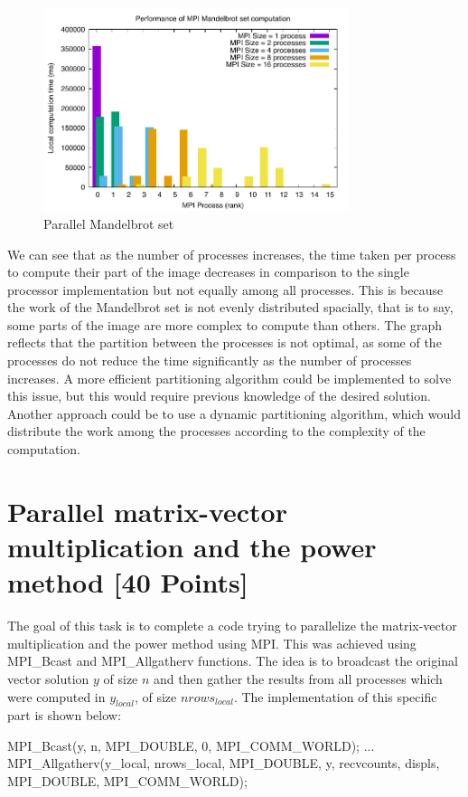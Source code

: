\documentclass[unicode,11pt,a4paper,oneside,numbers=endperiod,openany]{scrartcl}
\begin{document}
\begin{figure}[h!]
    \centering
    \includegraphics[width=0.8\textwidth]{../mandel/perf.pdf}
    \caption{Parallel Mandelbrot set}
    \label{fig:mandelbrot_parallel}
\end{figure}
We can see that as the number of processes increases, the time taken per process
to compute their part of the image decreases in comparison to the single
processor implementation but not equally among all processes. This is because
the work of the Mandelbrot set is not evenly distributed spacially, that is to
say, some parts of the image are more complex to compute than others. The graph
reflects that the partition between the processes is not optimal, as some of the
processes do not reduce the time significantly as the number of processes
increases. A more efficient partitioning algorithm could be implemented to solve
this issue, but this would require previous knowledge of the desired solution.
Another approach could be to use a dynamic partitioning algorithm, which would
distribute the work among the processes according to the complexity of the
computation.


\section{Parallel matrix-vector multiplication and the power method
[40 Points]}

The goal of this task is to complete a code trying to parallelize the
matrix-vector multiplication and the power method using MPI. This was achieved
using MPI\_Bcast and MPI\_Allgatherv functions. The idea is to broadcast the
original vector solution $y$ of size $n$ and then gather the results from all processes
which were computed in $y_{local}$, of size $nrows_{local}$. The implementation of this specific part is
shown below:
\begin{cppverbatim}
MPI_Bcast(y, n, MPI_DOUBLE, 0, MPI_COMM_WORLD);
...
MPI_Allgatherv(y_local, nrows_local, MPI_DOUBLE, y, recvcounts, displs, MPI_DOUBLE, MPI_COMM_WORLD);
\end{cppverbatim}
\end{document}
